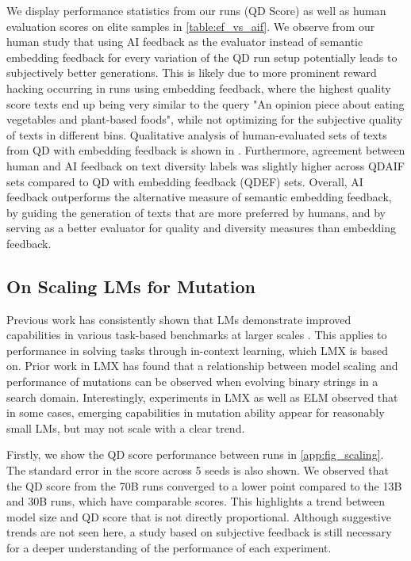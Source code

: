We display performance statistics from our runs (QD Score) as well as human evaluation scores on elite samples in \cref{table:ef_vs_aif}. We observe from our human study that using AI feedback as the evaluator instead of semantic embedding feedback for every variation of the QD run setup potentially leads to subjectively better generations. This is likely due to more prominent reward hacking \citep{skalse2022defining,lehman2019surprising} occurring in runs using embedding feedback, where the highest quality score texts end up being very similar to the query "An opinion piece about eating vegetables and plant-based foods", while not optimizing for the subjective quality of texts in different bins. Qualitative analysis of human-evaluated sets of texts from QD with embedding feedback is shown in . Furthermore, agreement between human and AI feedback on text diversity labels was slightly higher across QDAIF sets compared to QD with embedding feedback (QDEF) sets. Overall, AI feedback outperforms the alternative measure of semantic embedding feedback, by guiding the generation of texts that are more preferred by humans, and by serving as a better evaluator for quality and diversity measures than embedding feedback.

\clearpage
\newpage
\subsection{On Scaling LMs for Mutation}\label{app:scaling_discussion}
Previous work has consistently shown that LMs demonstrate improved capabilities in various task-based benchmarks at larger scales \citep{kaplan2020scaling,chowdhery2022palm,chung2022scaling}. This applies to performance in solving tasks through in-context learning, which LMX is based on. Prior work in LMX \citep{meyerson2023language} has found that a relationship between model scaling and performance of mutations can be observed when evolving binary strings in a search domain. Interestingly, experiments in LMX as well as ELM \citep{lehman2022evolution} observed that in some cases, emerging capabilities in mutation ability appear for reasonably small LMs, but may not scale with a clear trend.

Firstly, we show the QD score performance between runs in \cref{app:fig_scaling}. The standard error in the score across 5 seeds is also shown. We observed that the QD score from the 70B runs converged to a lower point compared to the 13B and 30B runs, which have comparable scores. This highlights a trend between model size and QD score that is not directly proportional. Although suggestive trends are not seen here, a study based on subjective feedback is still necessary for a deeper understanding of the performance of each experiment.

